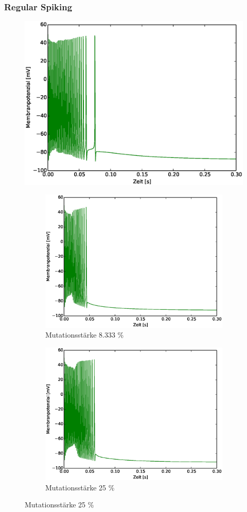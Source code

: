 \begin{frame}
  \frametitle{Regular Spiking}
  \begin{figure}
    \centering
    \includegraphics[viewport=19 10 532 394,width=0.35\linewidth]{genetic/rs-base.eps}
    \caption*{Mutationsstärke 15 \%}
    \begin{subfigure}{.5\textwidth}
      \centering
      \includegraphics*[viewport=19 10 532 394,width=0.7\linewidth]{genetic/rs-mut008333.eps}
      \caption*{Mutationsstärke 8.333 \%}
    \end{subfigure}%
    \begin{subfigure}{.5\textwidth}
      \centering
      \includegraphics*[viewport=19 10 532 394,width=0.7\linewidth]{genetic/rs-mut025.eps}
      \caption*{Mutationsstärke 25 \%}
    \end{subfigure}
  \end{figure}
\end{frame}

